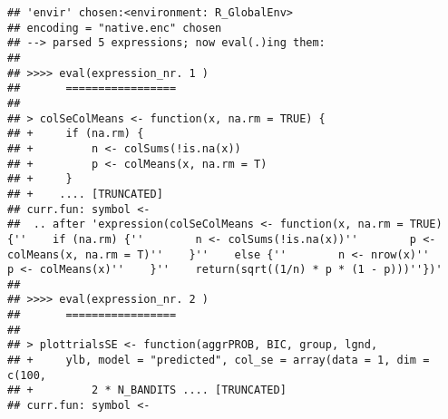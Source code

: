 \documentclass[11pt,,]{article}
\begin{document}
\begin{verbatim}
## 'envir' chosen:<environment: R_GlobalEnv>
## encoding = "native.enc" chosen
## --> parsed 5 expressions; now eval(.)ing them:
## 
## >>>> eval(expression_nr. 1 )
##       =================
## 
## > colSeColMeans <- function(x, na.rm = TRUE) {
## +     if (na.rm) {
## +         n <- colSums(!is.na(x))
## +         p <- colMeans(x, na.rm = T)
## +     }
## +    .... [TRUNCATED] 
## curr.fun: symbol <-
##  .. after 'expression(colSeColMeans <- function(x, na.rm = TRUE) {''    if (na.rm) {''        n <- colSums(!is.na(x))''        p <- colMeans(x, na.rm = T)''    }''    else {''        n <- nrow(x)''        p <- colMeans(x)''    }''    return(sqrt((1/n) * p * (1 - p)))''})'
## 
## >>>> eval(expression_nr. 2 )
##       =================
## 
## > plottrialsSE <- function(aggrPROB, BIC, group, lgnd, 
## +     ylb, model = "predicted", col_se = array(data = 1, dim = c(100, 
## +         2 * N_BANDITS .... [TRUNCATED] 
## curr.fun: symbol <-

\end{verbatim}
\end{document}

